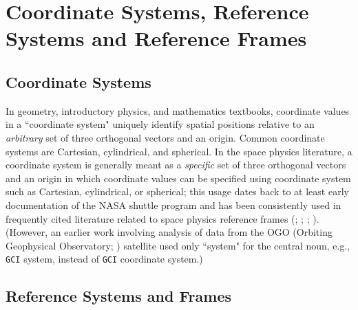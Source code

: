 \documentclass[draft]{agujournal2019}
\begin{document}
\section{Coordinate Systems, Reference Systems and Reference Frames}
\label{sect:terminology}


\subsection{Coordinate Systems}

In geometry, introductory physics, and mathematics textbooks, coordinate values in a ``coordinate system" uniquely identify spatial positions relative to an {\it arbitrary} set of three orthogonal vectors and an origin. Common coordinate systems are Cartesian, cylindrical, and spherical. In the space physics literature, a coordinate system is generally meant as a {\it specific} set of three orthogonal vectors and an origin in which coordinate values can be specified using coordinate system such as Cartesian, cylindrical, or spherical; this usage dates back to at least early documentation of the NASA shuttle program \cite{Davis1974} and has been consistently used in frequently cited literature related to space physics reference frames (; ; ; ). (However, an earlier work involving analysis of data from the OGO (Orbiting Geophysical Observatory; ) satellite used only ``system" for the central noun, e.g., \texttt{GCI} system, instead of \texttt{GCI} coordinate system.)


\subsection{Reference Systems and Frames}
\label{sect:refsystems}
\end{document}
